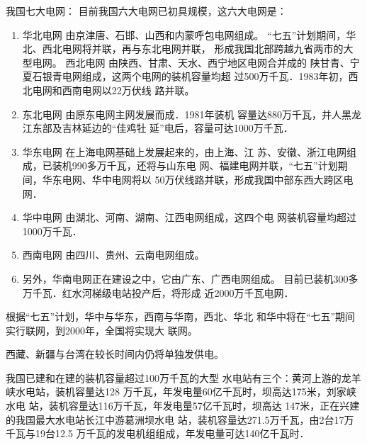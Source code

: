 我国七大电网：
目前我国六大电网已初具规模，这六大电网是：
\begin{enumerate}
\item 华北电网 由京津唐、石邯、山西和内蒙呼包电网组成。
“七五”计划期间，华北、西北电网将并联，再与东北电网并联，
形成我国北部跨越九省两市的大型电网。
西北电网 由陕西、甘肃、天水、西宁地区电网合并成的
陕甘青、宁夏石银青电网组成，这两个电网的装机容量均超
过500万千瓦．1983年初，西北电网和西南电网以22万伏线
路并联。
\item 东北电网 由原东电网主网发展而成．1981年装机
容量达880万千瓦，并人黑龙江东部及吉林延边的“佳鸡牡
延”电后，容量可达1000万千瓦．
\item 华东电网 在上海电网基础上发展起来的，由上海、江
苏、安徽、浙江电网组成，已装机990多万千瓦，还将与山东电
网、福建电网并联，“七五”计划期间，华东电网、华中电网将以
50万伏线路并联，形成我国中部东西大跨区电网．
\item 华中电网 由湖北、河南、湖南、江西电网组成，这四个电
网装机容量均超过1000万千瓦．
\item 西南电网 由四川、贵州、云南电网组成。
\item 另外，华南电网正在建设之中，它由广东、广西电网组成。
目前已装机300多万千瓦．红水河梯级电站投产后，将形成
近2000万千瓦电网．
\end{enumerate}

根据“七五”计划，华中与华东，西南与华南，西北、华北
和华中将在“七五”期间实行联网，到2000年，全国将实现大
联网。

西藏、新疆与台湾在较长时间内仍将单独发供电。

我国已建和在建的装机容量超过100万千瓦的大型
水电站有三个：黄河上游的龙羊峡水电站，装机容量达128
万千瓦，年发电量60亿千瓦时，坝高达175米，刘家峡水电
站，装机容量达116万千瓦，年发电量57亿千瓦时，坝高达
147米，正在兴建的我国最大水电站长江中游葛洲坝水电
站，装机容量达271.5万千瓦，由2台17万千瓦与19台12.5
万千瓦的发电机组组成，年发电量可达140亿千瓦时．


